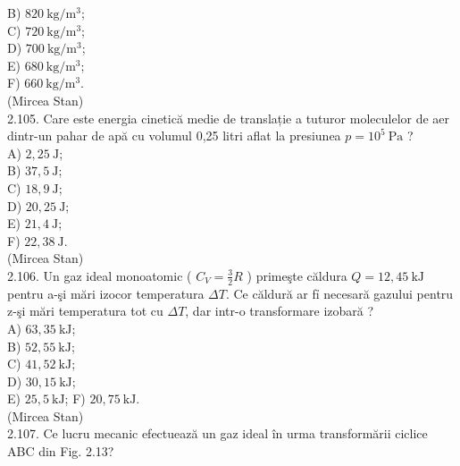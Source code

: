 \documentclass[10pt]{article}
\begin{document}
B) $820 \mathrm{~kg} / \mathrm{m}^{3}$;\\
C) $720 \mathrm{~kg} / \mathrm{m}^{3}$;\\
D) $700 \mathrm{~kg} / \mathrm{m}^{3}$;\\
E) $680 \mathrm{~kg} / \mathrm{m}^{3}$;\\
F) $660 \mathrm{~kg} / \mathrm{m}^{3}$.\\
(Mircea Stan)\\
2.105. Care este energia cinetică medie de translație a tuturor moleculelor de aer dintr-un pahar de apă cu volumul 0,25 litri aflat la presiunea $p=10^{5} \mathrm{~Pa}$ ?\\
A) $2,25 \mathrm{~J}$;\\
B) $37,5 \mathrm{~J}$;\\
C) $18,9 \mathrm{~J}$;\\
D) $20,25 \mathrm{~J}$;\\
E) $21,4 \mathrm{~J}$;\\
F) $22,38 \mathrm{~J}$.\\
(Mircea Stan)\\
2.106. Un gaz ideal monoatomic ( $C_{V}=\frac{3}{2} R$ ) primeşte căldura $Q=12,45 \mathrm{~kJ}$ pentru a-şi mări izocor temperatura $\Delta T$. Ce căldură ar fỉ necesară gazului pentru z-şi mări temperatura tot cu $\Delta T$, dar intr-o transformare izobară ?\\
A) $63,35 \mathrm{~kJ}$;\\
B) $52,55 \mathrm{~kJ}$;\\
C) $41,52 \mathrm{~kJ}$;\\
D) $30,15 \mathrm{~kJ}$;\\
E) $25,5 \mathrm{~kJ}$; F) $20,75 \mathrm{~kJ}$.\\
(Mircea Stan)\\
2.107. Ce lucru mecanic efectuează un gaz ideal în urma transformării ciclice ABC din Fig. 2.13?
\end{document}
